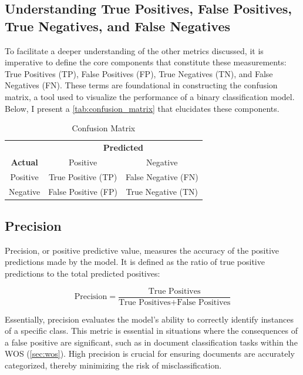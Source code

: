 \subsection{Understanding True Positives, False Positives, True Negatives, and False Negatives}

To facilitate a deeper understanding of the other metrics discussed, it is imperative to define the core components that constitute these measurements: True Positives (TP), False Positives (FP), True Negatives (TN), and False Negatives (FN). These terms are foundational in constructing the confusion matrix, a tool used to visualize the performance of a binary classification model. Below, I present a \autoref{tab:confusion_matrix} that elucidates these components.

\begin{table}[h]
    \centering
    \caption{Confusion Matrix}
    \begin{tabular}{|c|c|c|}
        \hline
                                          & \multicolumn{2}{c|}{\textbf{Predicted}}                       \\ \cline{2-3}
        \multirow{-2}{*}{\textbf{Actual}} & Positive                                & Negative            \\
        \hline
        Positive                          & True Positive (TP)                      & False Negative (FN) \\
        \hline
        Negative                          & False Positive (FP)                     & True Negative (TN)  \\
        \hline
    \end{tabular}

    \label{tab:confusion_matrix}
\end{table}


\subsection{Precision}

Precision, or positive predictive value, measures the accuracy of the positive predictions made by the model. It is defined as the ratio of true positive predictions to the total predicted positives:

$$
    \text{Precision} = \frac{\text{True Positives}}{\text{True Positives} + \text{False Positives}}
$$

Essentially, precision evaluates the model's ability to correctly identify instances of a specific class. This metric is essential in situations where the consequences of a false positive are significant, such as in document classification tasks within the WOS (\autoref{sec:wos}). High precision is crucial for ensuring documents are accurately categorized, thereby minimizing the risk of misclassification.

